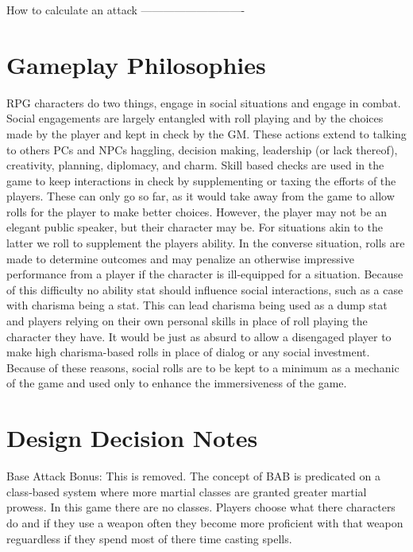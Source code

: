 \documentclass{article}
\begin{document}
How to calculate an attack
----------------------------






 
\section{Gameplay Philosophies}
RPG characters do two things, engage in social situations and engage in combat. Social engagements are largely entangled with roll playing and by the choices made by the player and kept in check by the GM. These actions extend to talking to others PCs and NPCs haggling, decision making, leadership (or lack thereof), creativity, planning, diplomacy, and charm. Skill based checks are used in the game to keep interactions in check by supplementing or taxing the efforts of the players. These can only go so far, as it would take away from the game to allow rolls for the player to make better choices. However, the player may not be an elegant public speaker, but their character may be. For situations akin to the latter we roll to supplement the players ability. In the converse situation, rolls are made to determine outcomes and may penalize an otherwise impressive performance from a player if the character is ill-equipped for a situation. Because of this difficulty no ability stat should influence social interactions, such as a case with charisma being a stat. This can lead charisma being used as a dump stat and players relying on their own personal skills in place of roll playing the character they have. It would be just as absurd to allow a disengaged player to make high charisma-based rolls in place of dialog or any social investment. Because of these reasons, social rolls are to be kept to a minimum as a mechanic of the game and used only to enhance the immersiveness of the game.  


\section{Design Decision Notes}
 
Base Attack Bonus: This is removed. The concept of BAB is predicated on a class-based system where more martial classes are granted greater martial prowess. In this game there are no classes. Players choose what there characters do and if they use a weapon often they become more proficient with that weapon reguardless if they spend most of there time casting spells.
 
 
 
\end{document}
